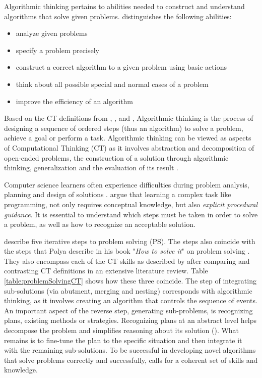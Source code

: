 Algorithmic thinking pertains to abilities needed to construct and understand algorithms that solve given problems.  distinguishes the following abilities:
\begin{itemize}
\item analyze given problems
\item specify a problem precisely
\item construct a correct algorithm to a given problem using basic actions
\item think about all possible special and normal cases of a problem
\item improve the efficiency of an algorithm
\end{itemize}
Based on the CT definitions from \cite{CAS2014CT}, \cite{Google2017CT}, \cite{BrennanResnick2012} and \cite{CSTA2011CT}, Algorithmic thinking is the process of designing a sequence of ordered steps (thus an algorithm) to solve a problem, achieve a goal or perform a task\cite{corradini2017conceptions}. Algorithmic thinking can be viewed as aspects of Computational Thinking (CT) as it involves abstraction and decomposition of open-ended problems, the construction of a solution through algorithmic thinking, generalization and the evaluation of its result \cite{Wing2006}.



Computer science learners often experience difficulties during problem analysis, planning and design of solutions \cite{Hazzan2011}.  argue that learning a complex task like programming, not only requires conceptual knowledge, but also \emph{explicit procedural guidance}. It is essential to understand which steps must be taken in order to solve a problem, as well as how to recognize an acceptable solution.


 describe five iterative steps to problem solving (PS). The steps also coincide with the steps that Polya describe in his book "\emph{How to solve it}" on problem solving \cite{polya2004solve}. They also encompass each of the CT skills as described by  after comparing and contrasting CT definitions in an extensive literature review.  Table \ref{table:problemSolvingCT} shows how these three coincide. The step of integrating sub-solutions (via abutment, merging and nesting) corresponds with algorithmic thinking, as it involves creating an algorithm that controls the sequence of events. An important aspect of the reverse step, generating sub-problems, is recognizing plans, existing methods or strategies. Recognizing plans at an abstract level helps decompose the problem and simplifies reasoning about its solution (\cite{Smetsers2017}). What remains is to fine-tune the plan to the specific situation and then integrate it with the remaining sub-solutions. To be successful in developing novel algorithms that solve problems correctly and successfully, calls for a coherent set of skills and knowledge.



